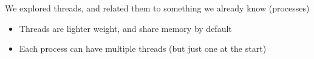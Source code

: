   \begin{slide}


    We explored threads, and related them to something we already know (processes)

    \begin{itemize}
      \item Threads are lighter weight, and share memory by default
      \item Each process can have multiple threads (but just one at the start)
    \end{itemize}

  \end{slide}


